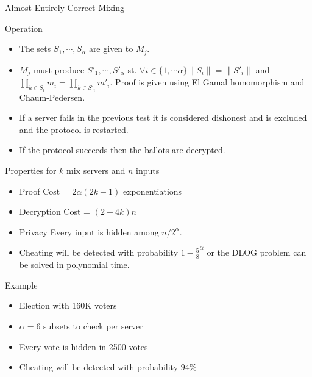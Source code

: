\documentclass{beamer}
\begin{document}
\begin{frame}[allowframebreaks]{Almost Entirely Correct Mixing \cite{BG02}}
\begin{block}{Operation}
\begin{itemize}
\item The sets $S_1,\cdots,S_{\alpha}$ are given to $M_j$.
\item $M_j$ must produce $S'_1,\cdots,S'_{\alpha}$ st. $\forall i \in \{ 1,\cdots \alpha \} \|S_i\| = \|S'_i\|$ and 
$\prod_{k \in S_i}  m_i =  \prod_{k \in S'_i}  m'_i $. Proof is given using El Gamal homomorphism and Chaum-Pedersen.
\item If a server fails in the previous test it is considered dishonest and is excluded and the protocol is restarted.
\item If the protocol succeeds then the ballots are decrypted.
\end{itemize}
\end{block}

\begin{block}{Properties for $k$ mix servers and $n$ inputs}
\begin{itemize}
\item Proof Cost = $2\alpha(2k-1)$ exponentiations
\item Decryption Cost = $(2+4k)n$
\item Privacy Every input is hidden among $n/2^\alpha$.
\item Cheating will be detected with probability $1-\frac{5}{8}^{\alpha}$ or the DLOG problem can be solved in polynomial time.
\end{itemize}
\end{block}

\begin{block}{Example}
\begin{itemize}
\item Election with 160K voters
\item $\alpha = 6$ subsets to check per server
\item Every vote is hidden in 2500 votes
\item Cheating will be detected with probability $94\%$
\end{itemize}
\end{block}

\end{frame}
\end{document}
